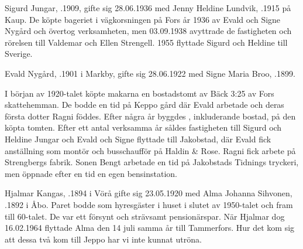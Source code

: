 %
Sigurd Jungar, .1909, gifte sig 28.06.1936 med Jenny Heldine Lundvik, .1915 på Kaup. De köpte bageriet i vägkorsningen på Fors år 1936 av Evald och Signe Nygård och övertog verksamheten, men 03.09.1938 avyttrade de fastigheten och rörelsen till Valdemar och Ellen Strengell. 1955 flyttade Sigurd och Heldine till Sverige.
\begin{jhchildren}
  \item {}
  \item {}
  \item {}
\end{jhchildren}


%
Evald Nygård, .1901 i Markby, gifte sig 28.06.1922 med Signe Maria Broo, .1899.

I början av 1920-talet köpte makarna en bostadstomt av Bäck 3:25 av Fors skattehemman. De bodde en tid på Keppo gård där Evald arbetade och deras första dotter Ragni föddes. Efter några år byggdes , inkluderande bostad, på den köpta tomten. Efter ett antal verksamma år såldes fastigheten till Sigurd och Heldine Jungar och Evald och Signe flyttade till Jakobstad, där Evald fick anställning som montör och busschaufför på Haldin \& Rose. Ragni fick arbete på Strengbergs fabrik. Sonen Bengt arbetade en tid på Jakobstads Tidnings tryckeri, men öppnade efter en tid en egen bensinstation.
\begin{jhchildren}
  \item {}
  \item {}
\end{jhchildren}



%


%
Hjalmar Kangas, .1894 i Vörå gifte sig 23.05.1920 med Alma Johanna Sihvonen, .1892 i Åbo. Paret bodde som hyresgäster i huset i slutet av 1950-talet och fram till 60-talet. De var ett försynt och strävsamt pensionärspar. När Hjalmar dog 16.02.1964 flyttade Alma den 14 juli samma år till Tammerfors. Hur det kom sig att dessa två kom till Jeppo har vi inte kunnat utröna.

